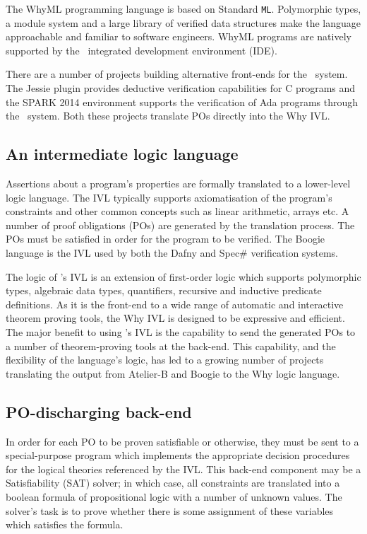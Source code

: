 The WhyML \cite{why:polymorphic} programming language is based on Standard \texttt{ML}. 
Polymorphic types, a module system and a large library of verified data structures make the language approachable and familiar to software engineers.
WhyML programs are natively supported by the \why~integrated development environment (IDE). 

There are a number of projects building alternative front-ends for the \why~system. 
The Jessie plugin \cite{Jessie:manual} provides deductive verification capabilities for C programs and the SPARK 2014 \cite{spark} environment supports the verification of Ada programs through the \why~system. 
Both these projects translate POs directly into the Why IVL.	
	
\subsection{An intermediate logic language} 

Assertions about a program's properties are formally translated to a lower-level logic language.
The IVL typically supports axiomatisation of the program's constraints and other common concepts such as linear arithmetic, arrays etc. A number of proof obligations (POs) are generated by the translation process. 
The POs must be satisfied in order for the program to be verified.
The Boogie language \cite{Boogie} is the IVL used by both the Dafny and Spec\# verification systems.

The logic of \why's IVL is an extension of first-order logic which supports polymorphic types, algebraic data types, quantifiers, recursive and inductive predicate definitions.
As it is the front-end to a wide range of automatic and interactive theorem proving tools, the Why IVL is designed to be expressive and efficient.
The major benefit to using \why's IVL is the capability to send the generated POs to a number of theorem-proving tools at the back-end.
This capability, and the flexibility of the language's logic, has led to a growing number of projects translating the output from Atelier-B \cite{atelierB2w, rodinplugin} and Boogie \cite{b2w} to the Why logic language.  

\subsection{PO-discharging back-end} 

In order for each PO to be proven satisfiable or otherwise, they must be sent to a special-purpose program which implements the appropriate decision procedures for the logical theories referenced by the IVL. This back-end component may be a Satisfiability (SAT) solver; in which case, all constraints are translated into a boolean formula of propositional logic with a number of unknown values. The solver's task is to prove whether there is some assignment of these variables which satisfies the formula. 
	
